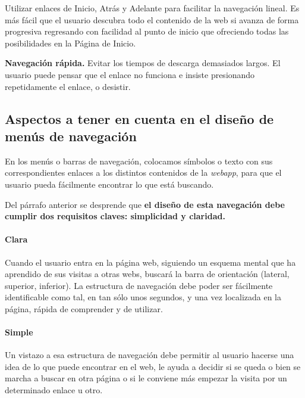 \documentclass[a4paper,oneside,11pt]{book}
\begin{document}
		Utilizar enlaces de Inicio, Atrás y Adelante para facilitar la navegación lineal. Es más fácil que el usuario descubra todo el contenido de la web si avanza de forma progresiva regresando con facilidad al punto de inicio que ofreciendo todas las posibilidades en la Página de Inicio.
		
		\textbf{Navegación rápida.} Evitar los tiempos de descarga demasiados largos. El usuario puede pensar que el enlace no funciona e insiste presionando repetidamente el enlace, o desistir. 
	
	\subsection{Aspectos a tener en cuenta en el diseño de menús de navegación} %
	\label{sub:nav_diseno_de_menu_de_navegacion}
	
		En los menús o barras de navegación, colocamos símbolos o texto con sus correspondientes enlaces a los distintos contenidos de la \textit{webapp}, para que el usuario pueda fácilmente encontrar lo que está buscando.
		
		Del párrafo anterior se desprende que \textbf{el diseño de esta navegación debe cumplir dos requisitos claves: simplicidad y claridad.}
		 
		\paragraph{Clara} %
		\label{par:nav_clara}
			Cuando el usuario entra en la página web, siguiendo un esquema mental que ha aprendido de sus visitas a otras webs, buscará la barra de orientación (lateral, superior, inferior).
			La estructura de navegación debe poder ser fácilmente identificable como tal, en tan sólo unos segundos, y una vez localizada en la página, rápida de comprender y de utilizar.
		
		\paragraph{Simple} %
		\label{par:nav_simple}
			Un vistazo a esa estructura de navegación debe permitir al usuario hacerse una idea de lo que puede encontrar en el web, le ayuda a decidir si se queda o bien se marcha a buscar en otra página o si le conviene más empezar la visita por un determinado enlace u otro.
			
		
\end{document}
